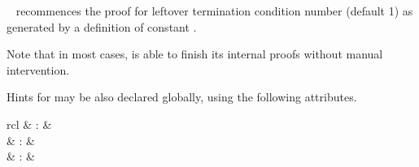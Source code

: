 \begin{isabellebody}
\begin{isamarkuptext}
\begin{description}
  \item \hyperlink{command.HOL.recdef-tc}{\mbox{}}~ recommences the
  proof for leftover termination condition number  (default
  1) as generated by a \hyperlink{command.HOL.recdef}{\mbox{}} definition of
  constant .

  Note that in most cases, \hyperlink{command.HOL.recdef}{\mbox{}} is able to finish
  its internal proofs without manual intervention.

  \end{description}

  \medskip Hints for \hyperlink{command.HOL.recdef}{\mbox{}} may be also declared
  globally, using the following attributes.

  \begin{matharray}{rcl}
    \hypertarget{attribute.HOL.recdef-simp}{\hyperlink{attribute.HOL.recdef-simp}{\mbox{}}} & : &  \\
    \hypertarget{attribute.HOL.recdef-cong}{\hyperlink{attribute.HOL.recdef-cong}{\mbox{}}} & : &  \\
    \hypertarget{attribute.HOL.recdef-wf}{\hyperlink{attribute.HOL.recdef-wf}{\mbox{}}} & : &  \\
  \end{matharray}


\end{isamarkuptext}
\end{isabellebody}

